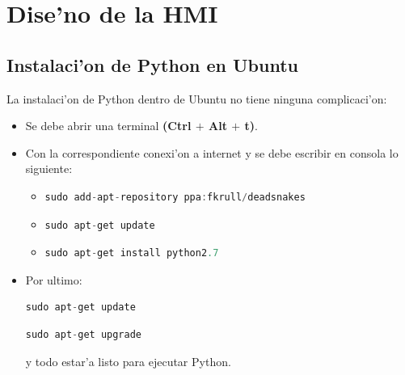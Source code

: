 \section{Dise'no de la HMI}
\subsection{Instalaci'on de Python en Ubuntu}
La instalaci'on de Python dentro de Ubuntu no tiene ninguna complicaci'on:
\begin{itemize}
	\item Se debe abrir una terminal \textbf{(Ctrl $+$ Alt $+$ t)}.
	\item Con la correspondiente conexi'on a internet y  se debe escribir en consola lo siguiente:
	
	\begin{itemize}
		\item {\small
\begin{lstlisting}[language=C]
sudo add-apt-repository ppa:fkrull/deadsnakes
\end{lstlisting}
}

		\item {\small
\begin{lstlisting}[language=C]
sudo apt-get update
\end{lstlisting}
}
		\item {\small
\begin{lstlisting}[language=C]
sudo apt-get install python2.7
\end{lstlisting}
}
	\end{itemize}
	\item Por ultimo: {\small\begin{lstlisting}[language=C]
	sudo apt-get update \end{lstlisting}}
	{\small\begin{lstlisting}[language=C]
	sudo apt-get upgrade \end{lstlisting}} y todo estar'a listo para ejecutar Python.
\end{itemize}

